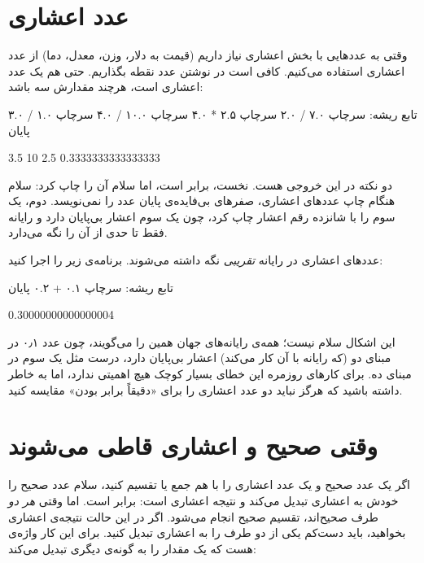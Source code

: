 \section{عدد اعشاری}

وقتی به عددهایی با بخش اعشاری نیاز داریم (قیمت به دلار، وزن، معدل، دما)
از عدد اعشاری استفاده می‌کنیم. کافی است در نوشتن عدد نقطه بگذاریم. حتی
 هم یک عدد اعشاری است، هرچند مقدارش سه باشد:

\begin{salamfa}
تابع ریشه:
    سرچاپ ۷.۰ / ۲.۰
    سرچاپ ۲.۵ * ۴.۰
    سرچاپ ۱۰.۰ / ۴.۰
    سرچاپ ۱.۰ / ۳.۰
پایان
\end{salamfa}

\begin{outputfa}
3.5
10
2.5
0.3333333333333333
\end{outputfa}

دو نکته در این خروجی هست. نخست،  برابر  است، اما
سلام آن را  چاپ کرد: سلام هنگام چاپ عددهای اعشاری، صفرهای بی‌فایده‌ی
پایان عدد را نمی‌نویسد. دوم، یک سوم را با شانزده رقم اعشار چاپ کرد، چون
یک سوم اعشار بی‌پایان دارد و رایانه فقط تا حدی از آن را نگه می‌دارد.

\begin{warn}
عددهای اعشاری در رایانه \emph{تقریبی} نگه داشته می‌شوند. برنامه‌ی زیر را
اجرا کنید:
\begin{salamfa}
تابع ریشه:
    سرچاپ ۰.۱ + ۰.۲
پایان
\end{salamfa}
\begin{outputfa}
0.30000000000000004
\end{outputfa}
این اشکال سلام نیست؛ همه‌ی رایانه‌های جهان همین را می‌گویند، چون عدد ۰٫۱
در مبنای دو (که رایانه با آن کار می‌کند) اعشار بی‌پایان دارد، درست مثل یک
سوم در مبنای ده. برای کارهای روزمره این خطای بسیار کوچک هیچ اهمیتی
ندارد، اما به خاطر داشته باشید که هرگز نباید دو عدد اعشاری را برای
«دقیقاً برابر بودن» مقایسه کنید.
\end{warn}

\section{وقتی صحیح و اعشاری قاطی می‌شوند}

اگر یک عدد صحیح و یک عدد اعشاری را با هم جمع یا تقسیم کنید، سلام عدد صحیح
را خودش به اعشاری تبدیل می‌کند و نتیجه اعشاری است:  برابر
 است. اما وقتی \emph{هر دو} طرف صحیح‌اند، تقسیم صحیح انجام می‌شود.
اگر در این حالت نتیجه‌ی اعشاری بخواهید، باید دست‌کم یکی از دو طرف را به
اعشاری تبدیل کنید. برای این کار واژه‌ی  هست که یک مقدار را به
گونه‌ی دیگری تبدیل می‌کند:

